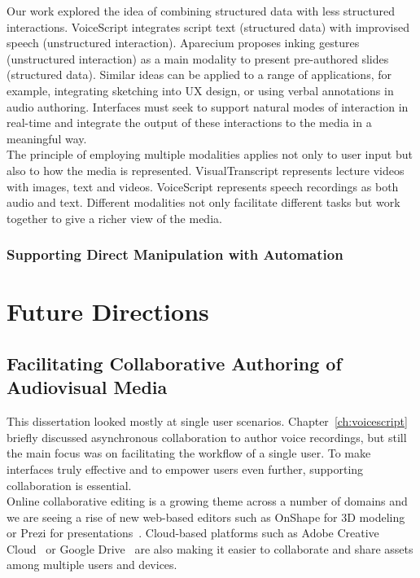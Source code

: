 Our work explored the idea of combining structured data with less structured interactions. VoiceScript integrates script text (structured data) with improvised speech (unstructured interaction). Aparecium proposes inking gestures (unstructured interaction) as a main modality to present pre-authored slides (structured data). Similar ideas can be applied to a range of applications, for example, integrating sketching into UX design, or using verbal annotations in audio authoring. Interfaces must seek to support natural modes of interaction in real-time and integrate the output of these interactions to the media in a meaningful way. \\

The principle of employing multiple modalities applies not only to user input but also to how the media is represented. VisualTranscript represents lecture videos with images, text and videos. VoiceScript represents speech recordings as both audio and text. Different modalities not only facilitate different tasks but work together to give a richer view of the media.

\subsubsection{Supporting Direct Manipulation with Automation}



\section{Future Directions}
\subsection{Facilitating Collaborative Authoring of Audiovisual Media}
This dissertation looked mostly at single user scenarios. Chapter~\ref{ch:voicescript} briefly discussed asynchronous collaboration to author voice recordings, but still the main focus was on facilitating the workflow of a single user. To make interfaces truly effective and to
empower users even further, supporting collaboration is essential.\\

Online collaborative editing is a growing theme across a number of domains and we are seeing a rise of new web-based editors such as OnShape for 3D modeling~\cite{onshape2017} or Prezi for presentations~\cite{prezi2017}. Cloud-based platforms such as Adobe Creative Cloud~\cite{creativecloud2017} or Google Drive~\cite{googledrive2017} are also making it easier to collaborate and share assets among multiple users and devices.\\

